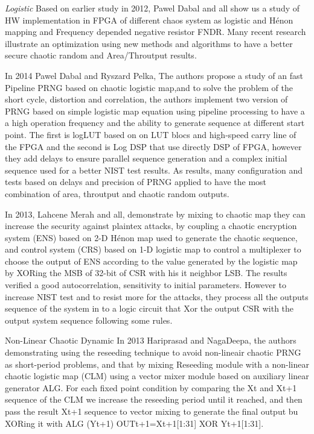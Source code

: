 \textit{Logistic} Based on earlier study in 2012, Pawel Dabal and all show us a study of HW implementation in FPGA of different chaos system as logistic and Hénon mapping and Frequency depended negative resistor FNDR. Many recent research illustrate an optimization using new methods and algorithms to have a better secure chaotic random and Area/Throutput results.

In 2014 Pawel Dabal and Ryszard Pelka, The authors propose a study of an fast Pipeline PRNG based on chaotic logistic map,and to solve the problem of the short cycle, distortion and correlation, the authors implement two version of PRNG based on simple logistic map equation using pipeline processing to have a a high operation frequency and the ability to generate sequence at different start point. The first is logLUT based on on LUT blocs and high-speed carry line of the FPGA and the second is Log DSP that use directly DSP of FPGA, however they add delays to ensure parallel sequence generation and a complex initial sequence used for a better NIST test results. As results, many configuration and tests based on delays and precision of PRNG applied to have the most combination of area, throutput and chaotic random outputs. 

In 2013, Lahcene Merah and all, demonstrate by mixing to chaotic map they can increase the security against plaintex attacks, by coupling a chaotic encryption system (ENS) based on 2-D Hénon map used to generate the chaotic sequence, and control system (CRS) based on 1-D logistic map to control a multiplexer to choose the output of ENS according to the value generated by the logistic map by XORing the MSB of 32-bit of CSR with his it neighbor LSB. The results verified a good autocorrelation, sensitivity to initial parameters. However to increase NIST test and to resist more for the attacks, they process all the outputs sequence of the system in to a logic circuit that Xor the output CSR with the output system sequence following some rules.

Non-Linear Chaotic Dynamic
In 2013 Hariprasad and NagaDeepa, the authors demonstrating using the reseeding technique to avoid non-lineair chaotic PRNG as short-period problems, and that by mixing Reseeding module with a non-linear chaotic logistic map (CLM) using a vector mixer module based on auxiliary linear generator ALG. For each fixed point condition by comparing the Xt and Xt+1 sequence of the CLM we increase the reseeding period until it reached, and then pass the result Xt+1 sequence to vector mixing to generate the final output bu XORing it with ALG (Yt+1) OUTt+1=Xt+1[1:31] XOR Yt+1[1:31].

